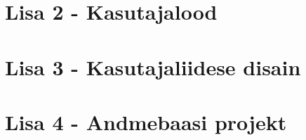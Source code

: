 \clearpage
{}
{}\label{chapter:userstories}
\chapter*{Lisa 2 - Kasutajalood}


\clearpage
{}
{}\label{chapter:interface_design}
\chapter*{Lisa 3 - Kasutajaliidese disain}


\clearpage
{}
{}\label{chapter:database_project}
\chapter*{Lisa 4 - Andmebaasi projekt}



%

